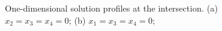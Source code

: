 \documentclass{beamer}
\begin{document}
\begin{frame}
\begin{figure}
	\caption{One-dimensional solution profiles at the intersection. (a) $x_2=x_3=x_4=0$; (b) $x_1=x_3=x_4=0$;}
\end{figure}	
\end{frame}
\end{document}
